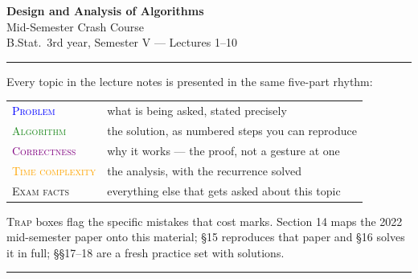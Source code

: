 \documentclass[11pt]{article}
\begin{document}
\begin{center}
{\LARGE\bfseries Design and Analysis of Algorithms}\\[4pt]
{\large Mid-Semester Crash Course}\\[3pt]
{\small B.Stat.\ 3rd year, Semester V --- Lectures 1--10}
\end{center}
\vspace{2pt}\hrule\vspace{10pt}

\noindent Every topic in the lecture notes is presented in the same five-part rhythm:

\begin{center}
\begin{tabular}{@{}ll@{}}
\toprule
\textcolor{Blue}{\textsc{Problem}} & what is being asked, stated precisely \\
\textcolor{ForestGreen}{\textsc{Algorithm}} & the solution, as numbered steps you can reproduce \\
\textcolor{Purple}{\textsc{Correctness}} & why it works --- the proof, not a gesture at one \\
\textcolor{Orange}{\textsc{Time complexity}} & the analysis, with the recurrence solved \\
\textcolor{BrickRed}{\textsc{Exam facts}} & everything else that gets asked about this topic \\
\bottomrule
\end{tabular}
\end{center}

\noindent \textsc{Trap} boxes flag the specific mistakes that cost marks. Section 14 maps the
2022 mid-semester paper onto this material; \S15 reproduces that paper and \S16 solves it in
full; \S\S17--18 are a fresh practice set with solutions.

\tableofcontents
\vspace{8pt}\hrule\vspace{10pt}




\end{document}

